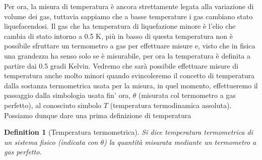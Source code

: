 \documentclass[10pt,a4paper]{article}
\newtheorem{definition}{Definition}
\begin{document}
\FloatBarrier
Per ora, la misura di temperatura è ancora strettamente legata alla variazione di volume dei gas, tuttavia sappiamo che a basse temperature i gas cambiano stato liquefacendosi. Il gas che ha temperatura di liquefazione minore è l'elio che cambia di stato intorno a 0.5 \textdegree K, più in basso di questa temperatura non è possibile sfruttare un termometro a gas per effettuare misure e, visto che in fisica una grandezza ha senso solo se è misurabile, per ora la temperatura è definita a partire dai 0.5 gradi Kelvin. Vedremo che sarà possibile effettuare misure di temperatura anche molto minori quando svincoleremo il concetto di temperatura dalla sostanza termometrica usata per la misura, in quel momento, effettueremo il passaggio dalla simbologia usata fin' ora, $\theta$ (misurata col termometro a gas perfetto), al conosciuto simbolo $T$ (temperatura termodinamica assoluta).\\
Possiamo dunque dare una prima definizione di temperatura
\begin{definition}[Temperatura termometrica]
	Si dice temperatura termometrica di un sistema fisico (indicata con $\theta$) la quantità misurata mediante un termometro a gas perfetto.
\end{definition}
\end{document}
